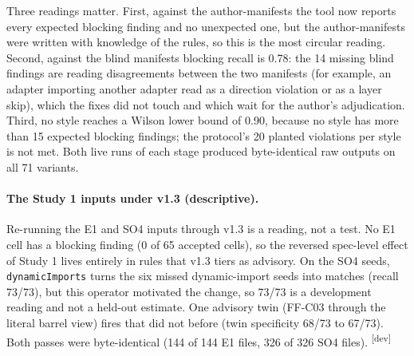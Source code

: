 \documentclass[10pt,a4paper]{article}
\newcommand{\devset}{\textsuperscript{\textsf{\tiny[dev]}}}
\begin{document}
Three readings matter. First, against the author-manifests the tool now reports every expected blocking finding and
no unexpected one, but the author-manifests were written with knowledge of the rules, so this is the most circular
reading. Second, against the blind manifests blocking recall is 0.78: the 14 missing blind findings are reading
disagreements between the two manifests (for example, an adapter importing another adapter read as a direction
violation or as a layer skip), which the fixes did not touch and which wait for the author's adjudication. Third, no
style reaches a Wilson lower bound of 0.90, because no style has more than 15 expected blocking findings; the
protocol's 20 planted violations per style is not met. %
Both live runs of each stage produced byte-identical raw outputs on all 71 variants. %

\paragraph{The Study 1 inputs under v1.3 (descriptive).}
Re-running the E1 and SO4 inputs through v1.3 is a reading, not a test. No E1 cell has a blocking finding (0 of 65
accepted cells), so the reversed spec-level effect of Study 1 lives entirely in rules that v1.3 tiers as advisory.
On the SO4 seeds, \texttt{dynamicImports} turns the six missed dynamic-import seeds into matches (recall 73/73),
but this operator motivated the change, so 73/73 is a development reading and not a held-out estimate. One advisory
twin (FF-C03 through the literal barrel view) fires that did not before (twin specificity 68/73 to 67/73). Both
passes were byte-identical (144 of 144 E1 files, 326 of 326 SO4 files). \devset{}
\end{document}
